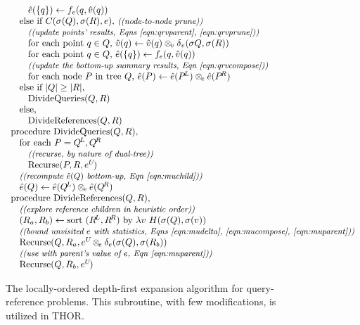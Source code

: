\documentclass[twoside,leqno,twocolumn]{article}
\newcommand{\com}[1]{{\small \textit{((#1))}}}
\newcommand{\summary}{\delta}
\newcommand{\psty}{}
\newcommand{\X}{\\ \psty}
\newcommand{\x}{\X \hspace{0.13in}}
\newcommand{\xx}{\X \hspace{0.26in}}
\newcommand{\kdroot}[1]{#1^{\text{root}}}
\newcommand{\kdleft}[1]{#1^{\!L}}
\newcommand{\kdright}[1]{#1^{\!R}}
\newcommand{\nameop}[2]{#1_{\!#2}}
\newcommand{\myop}[1]{\nameop{\otimes}{#1}}
\newcommand{\letterqr}{v}
\newcommand{\outqr}{V}
\newcommand{\opqr}{\myop{\letterqr}}
\newcommand{\gqr}{g_{\letterqr}}
\newcommand{\letterqrv}{v}
\newcommand{\deltaqrv}{\summary_{\letterqrv}}
\newcommand{\varqr}{\hat{\letterqr}}
\newcommand{\varqrvparent}{\letterqrv^{P}}
\newcommand{\lettermu}{e}
\newcommand{\outopmu}{\myop{\lettermu}}
\newcommand{\opmu}{\myop{\lettermu}}
\newcommand{\fmu}{f_{\lettermu}}
\newcommand{\fmuv}{f_{\lettermu}}
\newcommand{\deltamu}{\summary_{\lettermu}}
\newcommand{\canprunemu}{C}
\newcommand{\heurqr}{H}
\newcommand{\varmuchild}{\hat{\lettermu}}
\newcommand{\varmuparent}{\lettermu^{U\!}}
\newcommand{\outstat}{\sigma}
\begin{document}
\begin{figure}
\[\begin{array}[t]{l}
    \xx \varmuchild(\{q\}) \gets \fmu(q, \varqr(q))
    \x \text{else if } \canprunemu(\outstat(Q), \outstat(R), \lettermu)\text{, \com{node-to-node prune}}
    \xx \text{\com{update points' results, Eqns \ref{eqn:qrvparent}, \ref{eqn:qrvprune}}}
    \xx \text{for each point }q \in Q\text{, }\varqr(q) \gets \varqr(q) \opqr \deltaqrv(\outstat{Q}, \outstat(R))
    \xx \text{for each point }q \in Q\text{, }\varmuchild(\{q\}) \gets \fmu(q, \varqr(q))
    \xx \text{\com{update the bottom-up summary results, Eqn \ref{eqn:qrvcompose}}}
    \xx \text{for each node }P\text{ in tree }Q\text{, }\varmuchild(P) \gets \varmuchild(\kdleft{P}) \outopmu \varmuchild(\kdright{P})
    \x \text{else if } |Q| \geq |R|\text{,}
    \xx \text{DivideQueries}(Q, R)
    \x \text{else,}
    \xx \text{DivideReferences}(Q, R)
    
    \X \text{procedure DivideQueries}(Q, R)\text{,}
    \x \text{for each } P = \kdleft{Q}, \kdright{Q}
    \xx \text{\com{recurse, by nature of dual-tree}}
    \xx \text{Recurse}(P, R, \varmuparent)
    \x \text{\com{recompute $\varmuchild(Q)$ bottom-up, Eqn~\ref{eqn:muchild}}}
    \x \varmuchild(Q) \gets \varmuchild(\kdleft{Q}) \outopmu \varmuchild(\kdright{Q})

    \X \text{procedure DivideReferences}(Q, R)\text{,}
    \x \text{\com{explore reference children in heuristic order}}
    \x (R_a, R_b) \gets \text{sort }(\kdleft{R}, \kdright{R})\text{ by }\lambda v ~ \heurqr(\outstat(Q), \outstat(v))
    \x \text{\com{bound unvisited $\lettermu$ with statistics, Eqns \ref{eqn:mudelta}, \ref{eqn:mucompose}, \ref{eqn:muparent}}}
    \x \text{Recurse}(Q, R_a, \varmuparent \opmu \deltamu(\outstat(Q), \outstat(R_b))
    \x \text{\com{use with parent's value of $\lettermu$, Eqn \ref{eqn:muparent}}}
    \x \text{Recurse}(Q, R_b, \varmuparent)
  \end{array}
\]
\caption{\label{fig:DepthFirst} The locally-ordered depth-first expansion algorithm for query-reference problems.
This subroutine, with few modifications, is utilized in THOR.
}
\end{figure}
\end{document}

